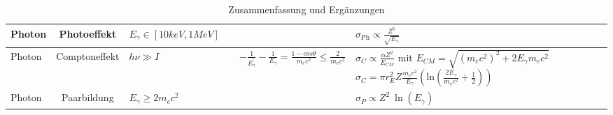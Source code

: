 \documentclass[Ex4_Zusammenfassung.tex]{subfiles}
\begin{document}
\begin{table}
\begin{tabular} {p{1.6cm} | c | p{3.5cm} | p{4cm} | p{5cm} | p{5.5cm} }
              Photon & Photoeffekt & $E_{\gamma} \in [10 keV,1 MeV] $ & & & $ \sigma_{\text{Ph}} \propto \frac{Z^5}{\sqrt{E_{\gamma}}} $ \\ 
              \hline
              
              Photon & Comptoneffekt & $h \nu \gg I$ & & $ - \frac{1}{E_{\gamma}^{'}} - \frac{1}{E_{\gamma}} = \frac{1 - cos \theta}{m_e c^2}  \leq \frac{2}{m_e c^2} $ & $ \sigma_{C} \propto \frac{\alpha Z^2}{E_{CM}} $ 
             \newline \newline mit  \newline $ E_{CM} = \sqrt{(m_e c^2)^2 + 2 E_{\gamma} m_e c^2} $ \newline \newline $ \sigma_{C} = \pi r_E^2 Z \frac{m_e c^2}{E_{\gamma}} \left( \text{ln}  \left(\frac{2 E_{\gamma}}{m_e c^2}  + \frac{1}{2} \right) \right)$ \\ 
              \hline
              
              Photon & Paarbildung & $ E_{\gamma} \geq 2 m_e c^2$ & & & $ \sigma_{P} \propto Z^2 \  \ln (E_{\gamma}) $ \\
           \bottomrule
        \end{tabular}\hspace*{-1cm}
        \caption{Zusammenfassung und Ergänzungen}
\end{table}
\clearpage
\end{document}
